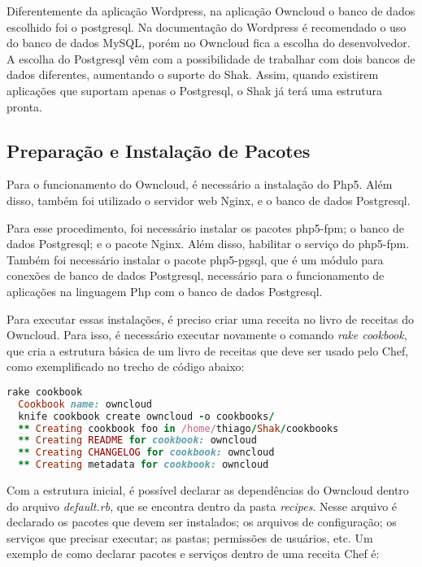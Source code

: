 Diferentemente da aplicação Wordpress, na aplicação Owncloud o 
banco de dados escolhido foi o postgresql. Na documentação do Wordpress é recomendado
o uso do banco de dados MySQL, porém no Owncloud fica a escolha do desenvolvedor.
A escolha do Postgresql vêm com a possibilidade de trabalhar com dois bancos de
dados diferentes, aumentando o suporte do Shak. Assim, quando existirem aplicações
que suportam apenas o Postgresql, o Shak já terá uma estrutura pronta.

\subsection{Preparação e Instalação de Pacotes}

Para o funcionamento do Owncloud, é necessário a instalação do Php5. Além
disso, também foi utilizado o servidor web Nginx, e o 
banco de dados Postgresql.

Para esse procedimento, foi necessário instalar os pacotes php5-fpm; o banco
de dados Postgresql; e o pacote Nginx. Além disso, habilitar o serviço do php5-fpm. 
Também foi necessário instalar o pacote php5-pgsql, que é um módulo para
conexões de banco de dados Postgresql, necessário para o funcionamento de
aplicações na linguagem Php com o banco de dados Postgresql.

Para executar essas instalações, é preciso criar uma receita no livro de receitas
do Owncloud. Para isso, é necessário executar novamente o comando \textit{rake cookbook}, 
que cria a estrutura básica de um livro de receitas que deve ser usado pelo Chef, 
como exemplificado no trecho de código abaixo:

\begin{lstlisting}[language=Ruby,label=dice_index,caption={Exemplo de criação de estrutura básica de livro de receitas do Owncloud com Shak}]
  rake cookbook
  Cookbook name: owncloud
  knife cookbook create owncloud -o cookbooks/
  ** Creating cookbook foo in /home/thiago/Shak/cookbooks
  ** Creating README for cookbook: owncloud
  ** Creating CHANGELOG for cookbook: owncloud
  ** Creating metadata for cookbook: owncloud
\end{lstlisting}

Com a estrutura inicial, é possível declarar as dependências do Owncloud
dentro do arquivo \textit{default.rb}, que se encontra dentro da pasta 
\textit{recipes}. Nesse arquivo é 
declarado os pacotes que devem ser instalados; os arquivos de configuração;
os serviços que precisar executar; as pastas; permissões de usuários, etc. Um exemplo
de como declarar pacotes e serviços dentro de uma receita Chef é:

